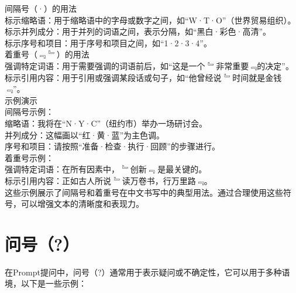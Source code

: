 \documentclass[12pt]{book}
\begin{document}
间隔号（·）的用法\\
标示缩略语：用于缩略语中的字母或数字之间，如“W·T·O”（世界贸易组织）。\\
标示并列成分：用于并列的词语之间，表示分隔，如“黑白·彩色·高清”。\\
标示序号和项目：用于序号和项目之间，如“1·2·3·4”。\\
着重号（﹃ ﹄）的用法\\
强调特定词语：用于需要强调的词语前后，如“这是一个 ﹄非常重要﹃的决定”。\\
标示引用内容：用于引用或强调某段话或句子，如“他曾经说 ﹄时间就是金钱﹃”。\\
示例演示\\
间隔号示例：\\
缩略语：我将在“N·Y·C”（纽约市）举办一场研讨会。\\
并列成分：这幅画以“红·黄·蓝”为主色调。\\
序号和项目：请按照“准备·检查·执行·回顾”的步骤进行。\\
着重号示例：\\
强调特定词语：在所有因素中， ﹄创新﹃ 是最关键的。\\
标示引用内容：正如古人所说 ﹄读万卷书，行万里路﹃。\\
这些示例展示了间隔号和着重号在中文书写中的典型用法。通过合理使用这些符号，可以增强文本的清晰度和表现力。\\

\section{问号（?）}
在Prompt提问中，问号（?）通常用于表示疑问或不确定性，它可以用于多种语境，以下是一些示例：\\
\end{document}
